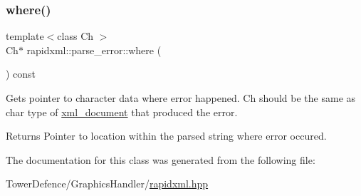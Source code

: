 \subsubsection{\texorpdfstring{where()}{where()}}
{\footnotesize\ttfamily template$<$class Ch $>$ \\
Ch$\ast$ rapidxml\+::parse\+\_\+error\+::where (\begin{DoxyParamCaption}{ }\end{DoxyParamCaption}) const\hspace{0.3cm}{\ttfamily [inline]}}

Gets pointer to character data where error happened. Ch should be the same as char type of \mbox{\hyperlink{classrapidxml_1_1xml__document}{xml\+\_\+document}} that produced the error. \begin{DoxyReturn}{Returns}
Pointer to location within the parsed string where error occured. 
\end{DoxyReturn}


The documentation for this class was generated from the following file\+:\begin{DoxyCompactItemize}
\item 
Tower\+Defence/\+Graphics\+Handler/\mbox{\hyperlink{rapidxml_8hpp}{rapidxml.\+hpp}}\end{DoxyCompactItemize}

